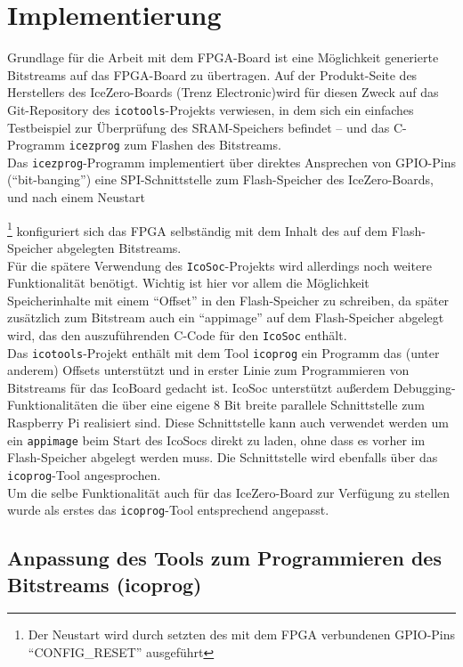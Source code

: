 \chapter{Implementierung}
\label{ch:Implementierung}

Grundlage für die Arbeit mit dem FPGA-Board ist eine Möglichkeit generierte Bitstreams auf das FPGA-Board zu übertragen.
Auf der Produkt-Seite des Herstellers des IceZero-Boards (Trenz Electronic)\cite{web:trenz_icezero}wird für diesen Zweck auf das Git-Repository des {\tt icotools}-Projekts verwiesen, in dem sich ein einfaches Testbeispiel zur Überprüfung des SRAM-Speichers befindet -- und das C-Programm {\tt icezprog} zum Flashen des Bitstreams.\\
Das {\tt icezprog}-Programm implementiert über direktes Ansprechen von GPIO-Pins (``bit-banging'') eine SPI-Schnittstelle zum Flash-Speicher des IceZero-Boards, und nach einem Neustart{\footnote{Der Neustart wird durch setzten des mit dem FPGA verbundenen GPIO-Pins ``CONFIG\_RESET'' ausgeführt} konfiguriert sich das FPGA selbständig mit dem Inhalt des auf dem Flash-Speicher abgelegten Bitstreams.\\
Für die spätere Verwendung des {\tt IcoSoc}-Projekts wird allerdings noch weitere Funktionalität benötigt. Wichtig ist hier vor allem die Möglichkeit Speicherinhalte mit einem ``Offset'' in den Flash-Speicher zu schreiben, da später zusätzlich zum Bitstream auch ein ``appimage'' auf dem Flash-Speicher abgelegt wird, das den auszuführenden C-Code für den {\tt IcoSoc} enthält.\\
Das {\tt icotools}-Projekt enthält mit dem Tool {\tt icoprog} ein Programm das (unter anderem) Offsets unterstützt und in erster Linie zum Programmieren von Bitstreams für das IcoBoard gedacht ist. IcoSoc unterstützt außerdem Debugging-Funktionalitäten die über eine eigene 8 Bit breite parallele Schnittstelle zum Raspberry Pi realisiert sind. Diese Schnittstelle kann auch verwendet werden um ein {\tt appimage} beim Start des IcoSocs direkt zu laden, ohne dass es vorher im Flash-Speicher abgelegt werden muss. Die Schnittstelle wird ebenfalls über das {\tt icoprog}-Tool angesprochen.\\
Um die selbe Funktionalität auch für das IceZero-Board zur Verfügung zu stellen wurde als erstes das {\tt icoprog}-Tool entsprechend angepasst. 

\section{Anpassung des Tools zum Programmieren des Bitstreams (icoprog)}
\label{ch:Implementierung:sec:icoprog}

}

